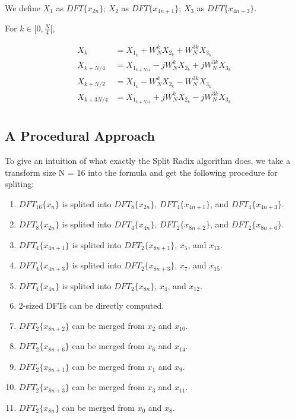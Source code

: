 \documentclass[a4paper]{report}
\begin{document}
	We define $X_1$ as $DFT\{x_{2n}\}$; $X_2$ as $DFT\{x_{4n+1}\}$; $X_3$ as $DFT\{x_{4n+3}\}$.

	\bigskip
	
	For $k \in [0, \frac{N}{4}[$,
	
	\[\begin{split}
  X_k & = X_{1_k} + W_N^k X_{2_k} + W_N^{3k} X_{3_k}\\
  X_{k + N/4} & = X_{1_{k + N/4}} - jW_N^k X_{2_k} + jW_N^{3k} X_{3_k} \\
  X_{k + N/2} & = X_{1_k} - W_N^k X_{2_k} - W_N^{3k} X_{3_k} \\
  X_{k + 3N/4} & = X_{1_{k + N/4}} + jW_N^k X_{2_k} - jW_N^{3k} X_{3_k} \\
	\end{split}\]

\subsection{A Procedural Approach} \indent

	To give an intuition of what exactly the Split Radix algorithm does, we take a transform size N = 16 into the formula and get the following procedure for spliting:
	
	\begin{enumerate}
	\item $DFT_{16}\{x_n\}$ is splited into $DFT_{8}\{x_{2n}\}$, $DFT_{4}\{x_{4n+1}\}$, and $DFT_{4}\{x_{4n+3}\}$.
	\item $DFT_{8}\{x_{2n}\}$ is splited into $DFT_{4}\{x_{4n}\}$, $DFT_{2}\{x_{8n+2}\}$, and $DFT_{2}\{x_{8n+6}\}$.
	\item $DFT_{4}\{x_{4n+1}\}$ is splited into $DFT_{2}\{x_{8n+1}\}$, $x_5$, and $x_{13}$.
	\item $DFT_{4}\{x_{4n+3}\}$ is splited into $DFT_{2}\{x_{8n+3}\}$, $x_7$, and $x_{15}$.
	\item $DFT_{4}\{x_{4n}\}$ is splited into $DFT_{2}\{x_{8n}\}$, $x_4$, and $x_{12}$.
	\item 2-sized DFTs can be directly computed.
	\item $DFT_{2}\{x_{8n+2}\}$ can be merged from $x_2$ and $x_{10}$.
	\item $DFT_{2}\{x_{8n+6}\}$ can be merged from $x_6$ and $x_{14}$.
	\item $DFT_{2}\{x_{8n+1}\}$ can be merged from $x_1$ and $x_{9}$.
	\item $DFT_{2}\{x_{8n+3}\}$ can be merged from $x_3$ and $x_{11}$.
	\item $DFT_{2}\{x_{8n}\}$ can be merged from $x_0$ and $x_{8}$.
	\end{enumerate}
	
\end{document}
